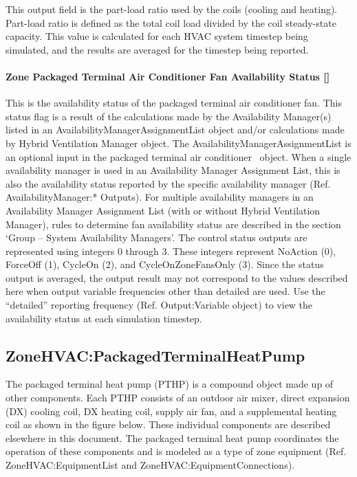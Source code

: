 This output field is the part-load ratio used by the coils (cooling and heating). Part-load ratio is defined as the total coil load divided by the coil steady-state capacity. This value is calculated for each HVAC system timestep being simulated, and the results are averaged for the timestep being reported.

\paragraph{Zone Packaged Terminal Air Conditioner Fan Availability Status {[]}}\label{zone-packaged-terminal-air-conditioner-fan-availability-status}

This is the availability status of the packaged terminal air conditioner fan. This status flag is a result of the calculations made by the Availability Manager(s) listed in an AvailabilityManagerAssignmentList object and/or calculations made by Hybrid Ventilation Manager object. The AvailabilityManagerAssignmentList is an optional input in the packaged terminal air conditioner~ object. When a single availability manager is used in an Availability Manager Assignment List, this is also the availability status reported by the specific availability manager (Ref. AvailabilityManager:* Outputs). For multiple availability managers in an Availability Manager Assignment List (with or without Hybrid Ventilation Manager), rules to determine fan availability status are described in the section `Group -- System Availability Managers'. The control status outputs are represented using integers 0 through 3. These integers represent NoAction (0), ForceOff (1), CycleOn (2), and CycleOnZoneFansOnly (3). Since the status output is averaged, the output result may not correspond to the values described here when output variable frequencies other than detailed are used. Use the ``detailed'' reporting frequency (Ref. Output:Variable object) to view the availability status at each simulation timestep.

\subsection{ZoneHVAC:PackagedTerminalHeatPump}\label{zonehvacpackagedterminalheatpump}

The packaged terminal heat pump (PTHP) is a compound object made up of other components. Each PTHP consists of an outdoor air mixer, direct expansion (DX) cooling coil, DX heating coil, supply air fan, and a supplemental heating coil as shown in the figure below. These individual components are described elsewhere in this document. The packaged terminal heat pump coordinates the operation of these components and is modeled as a type of zone equipment (Ref. ZoneHVAC:EquipmentList and ZoneHVAC:EquipmentConnections).

